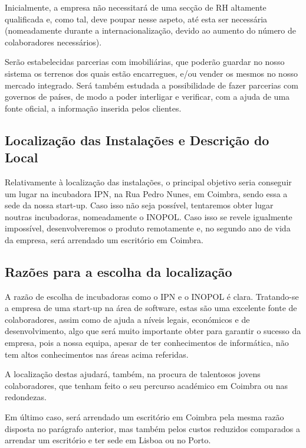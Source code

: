 \documentclass[11pt]{article}
\begin{document}
	Inicialmente, a empresa não necessitará de uma secção de RH altamente qualificada e, como tal, deve poupar nesse aspeto, até esta ser necessária (nomeadamente durante a internacionalização, devido ao aumento do número de colaboradores necessários).
	
	Serão estabelecidas parcerias com imobiliárias, que poderão guardar no nosso sistema os terrenos dos quais estão encarregues, e/ou vender os mesmos no nosso mercado integrado. Será também estudada a possibilidade de fazer parcerias com governos de países, de modo a poder interligar e verificar, com a ajuda de uma fonte oficial, a informação inserida pelos clientes.
	
	\large
	\subsection{Localização das Instalações e Descrição do Local}
	
	\normalsize
	
	Relativamente à localização das instalações, o principal objetivo seria conseguir um lugar na incubadora IPN, na Rua Pedro Nunes, em Coimbra, sendo essa a sede da nossa start-up. Caso isso não seja possível, tentaremos obter lugar noutras incubadoras, nomeadamente o INOPOL. Caso isso se revele igualmente impossível, desenvolveremos o produto remotamente e, no segundo ano de vida da empresa, será arrendado um escritório em Coimbra.
	
	\large
	\subsection{Razões para a escolha da localização}
	
	\normalsize
	
	A razão de escolha de incubadoras como o IPN e o INOPOL é clara. Tratando-se a empresa de uma start-up na área de software, estas são uma excelente fonte de colaboradores, assim como de ajuda a níveis legais, económicos e de desenvolvimento, algo que será muito importante obter para garantir o sucesso da empresa, pois a nossa equipa, apesar de ter conhecimentos de informática, não tem altos conhecimentos nas áreas acima referidas. 
	
	A localização destas ajudará, também, na procura de talentosos jovens colaboradores, que tenham feito o seu percurso académico em Coimbra ou nas redondezas.
	
	Em último caso, será arrendado um escritório em Coimbra pela mesma razão disposta no parágrafo anterior, mas também pelos custos reduzidos comparados a arrendar um escritório e ter sede em Lisboa ou no Porto.
	
\end{document}
